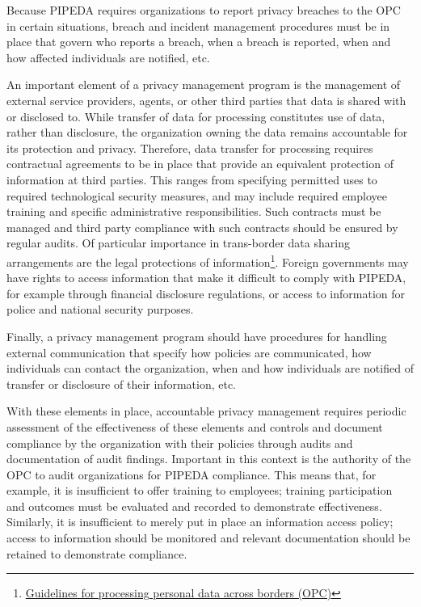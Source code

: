 Because PIPEDA requires organizations to report privacy breaches to the OPC in certain situations, breach and incident management procedures must be in place that govern who reports a breach, when a breach is reported, when and how affected individuals are notified, etc. 

An important element of a privacy management program is the management of external service providers, agents, or other third parties that data is shared with or disclosed to. While transfer of data for processing constitutes use of data, rather than disclosure, the organization owning the data remains accountable for its protection and privacy. Therefore, data transfer for processing requires contractual agreements to be in place that provide an equivalent protection of information at third parties. This ranges from specifying permitted uses to required technological security measures, and may include required employee training and specific administrative responsibilities. Such contracts must be managed and third party compliance with such contracts should be ensured by regular audits. Of particular importance in trans-border data sharing arrangements are the legal protections of information\footnote{\href{https://www.priv.gc.ca/en/privacy-topics/airports-and-borders/gl_dab_090127/}{Guidelines for processing personal data across borders (OPC)}}. Foreign governments may have rights to access information that make it difficult to comply with PIPEDA, for example through financial disclosure regulations, or access to information for police and national security purposes.

Finally, a privacy management program should have procedures for handling external communication that specify how policies are communicated, how individuals can contact the organization, when and how individuals are notified of transfer or disclosure of their information, etc.

With these elements in place, accountable privacy management requires periodic assessment of the effectiveness of these elements and controls and document compliance by the organization with their policies through audits and documentation of audit findings. Important in this context is the authority of the OPC to audit organizations for PIPEDA compliance. This means that, for example, it is insufficient to offer training to employees; training participation and outcomes must be evaluated and recorded to demonstrate effectiveness. Similarly, it is insufficient to merely put in place an information access policy; access to information should be monitored and relevant documentation should be retained to demonstrate compliance. 

